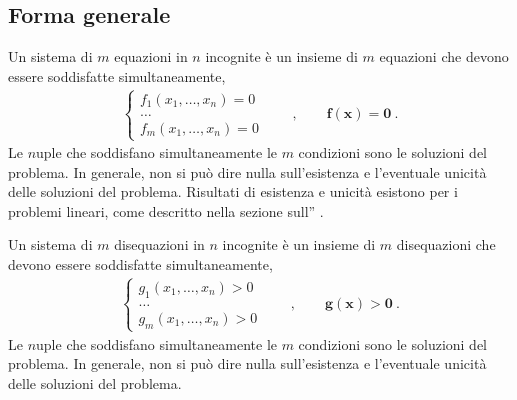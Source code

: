 \documentclass[letterpaper,10pt,italian]{jupyterBook}
\begin{document}
\subsection{Forma generale}
\label{\detokenize{ch/algebra/real-n-algebra:forma-generale}}
\sphinxAtStartPar
{} Un sistema di \(m\) equazioni in \(n\) incognite è un insieme di \(m\) equazioni che devono essere soddisfatte simultaneamente,
\begin{equation*}
\begin{split}
\begin{cases} f_1(x_1,\dots,x_n) = 0 \\ \dots \\f_m(x_1, \dots, x_n) = 0 \end{cases}
\qquad , \qquad \mathbf{f}(\mathbf{x}) = \mathbf{0} \ .\end{split}
\end{equation*}
\sphinxAtStartPar
Le \(n\)\sphinxhyphen{}uple che soddisfano simultaneamente le \(m\) condizioni sono le soluzioni del problema. In generale, non si può dire nulla sull’esistenza e l’eventuale unicità delle soluzioni del problema. Risultati di esistenza e unicità esistono per i problemi lineari, come descritto nella sezione sull”{\hyperref[\detokenize{ch/algebra::doc}]{}}  .

\sphinxAtStartPar
{} Un sistema di \(m\) disequazioni in \(n\) incognite è un insieme di \(m\) disequazioni che devono essere soddisfatte simultaneamente,
\begin{equation*}
\begin{split}
\begin{cases} g_1(x_1,\dots,x_n) > 0 \\ \dots \\g_m(x_1, \dots, x_n) > 0 \end{cases}
\qquad , \qquad \mathbf{g}(\mathbf{x}) > \mathbf{0} \ .\end{split}
\end{equation*}
\sphinxAtStartPar
Le \(n\)\sphinxhyphen{}uple che soddisfano simultaneamente le \(m\) condizioni sono le soluzioni del problema. In generale, non si può dire nulla sull’esistenza e l’eventuale unicità delle soluzioni del problema.
\end{document}
